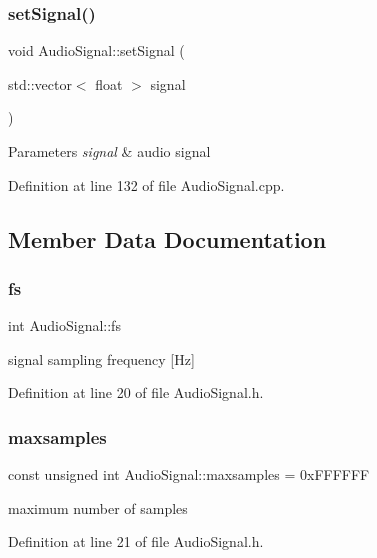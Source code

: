 \subsubsection{\texorpdfstring{set\+Signal()}{setSignal()}}
{\footnotesize\ttfamily void Audio\+Signal\+::set\+Signal (\begin{DoxyParamCaption}\item[{std\+::vector$<$ float $>$}]{signal }\end{DoxyParamCaption})}


\begin{DoxyParams}{Parameters}
{\em signal} & audio signal \\
\hline
\end{DoxyParams}


Definition at line 132 of file Audio\+Signal.\+cpp.



\subsection{Member Data Documentation}
\mbox{\label{class_audio_signal_acc2dc31d0dc3ca222df68a88c00cf2c9}} 
\subsubsection{\texorpdfstring{fs}{fs}}
{\footnotesize\ttfamily int Audio\+Signal\+::fs}

signal sampling frequency \mbox{[}Hz\mbox{]} 

Definition at line 20 of file Audio\+Signal.\+h.

\mbox{\label{class_audio_signal_a5d68faf1ab7f19197b93cc2cc0a7e645}} 
\subsubsection{\texorpdfstring{maxsamples}{maxsamples}}
{\footnotesize\ttfamily const unsigned int Audio\+Signal\+::maxsamples = 0x\+F\+F\+F\+F\+FF\hspace{0.3cm}{\ttfamily [static]}}

maximum number of samples 

Definition at line 21 of file Audio\+Signal.\+h.

